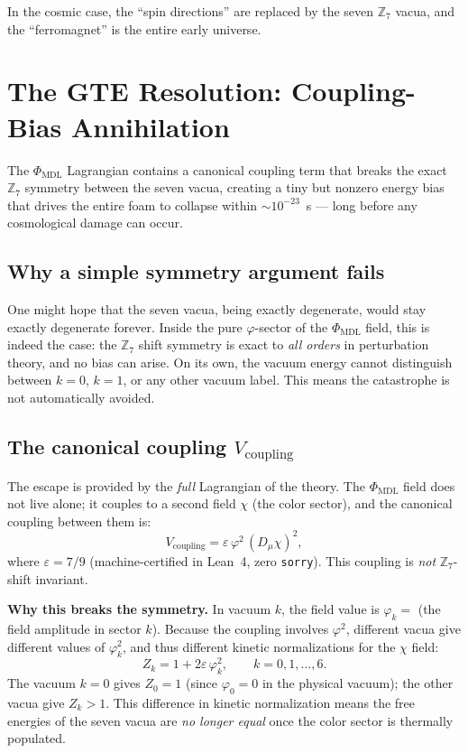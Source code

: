 \documentclass[11pt,a4paper]{article}
\newcommand{\PHIMDL}{\Phi_{\mathrm{MDL}}}
\newcommand{\ZS}{\mathbb{Z}_7}
\begin{document}
In the cosmic case, the ``spin directions'' are replaced by the seven
$\ZS$ vacua, and the ``ferromagnet'' is the entire early universe.

\section{The GTE Resolution: Coupling-Bias Annihilation}

\begin{tcolorbox}[colback=boxblue,colframe=blue!40!black,
  title=The resolution in one sentence]
The $\PHIMDL$ Lagrangian contains a canonical coupling term that breaks the
exact $\ZS$ symmetry between the seven vacua, creating a tiny but nonzero
energy bias that drives the entire foam to collapse within
$\sim\!10^{-23}$~s --- long before any cosmological damage can occur.
\end{tcolorbox}

\subsection{Why a simple symmetry argument fails}

One might hope that the seven vacua, being exactly degenerate, would stay
exactly degenerate forever.
Inside the pure $\varphi$-sector of the $\PHIMDL$ field, this is indeed the case:
the $\ZS$ shift symmetry is exact to \emph{all orders} in perturbation theory,
and no bias can arise.
On its own, the vacuum energy cannot distinguish between $k = 0$, $k = 1$,
or any other vacuum label.
This means the catastrophe is not automatically avoided.

\subsection{The canonical coupling \texorpdfstring{$V_\mathrm{coupling}$}{V-coupling}}

The escape is provided by the \emph{full} Lagrangian of the theory.
The $\PHIMDL$ field does not live alone; it couples to a second field $\chi$
(the color sector), and the canonical coupling between them is:
\[
  V_\mathrm{coupling} = \varepsilon\,\varphi^2\,(D_\mu\chi)^2,
\]
where $\varepsilon = 7/9$ (machine-certified in Lean~4, zero \texttt{sorry}).
This coupling is \emph{not} $\ZS$-shift invariant.

\medskip
\noindent
\textbf{Why this breaks the symmetry.}
In vacuum $k$, the field value is $\varphi_k = $ (the field amplitude in
sector $k$).
Because the coupling involves $\varphi^2$, different vacua give different
values of $\varphi_k^2$, and thus different kinetic normalizations for the
$\chi$ field:
\[
  Z_k = 1 + 2\varepsilon\,\varphi_k^2, \qquad k = 0, 1, \ldots, 6.
\]
The vacuum $k = 0$ gives $Z_0 = 1$ (since $\varphi_0 = 0$ in the physical
vacuum); the other vacua give $Z_k > 1$.
This difference in kinetic normalization means the free energies of the
seven vacua are \emph{no longer equal} once the color sector is thermally
populated.
\end{document}
